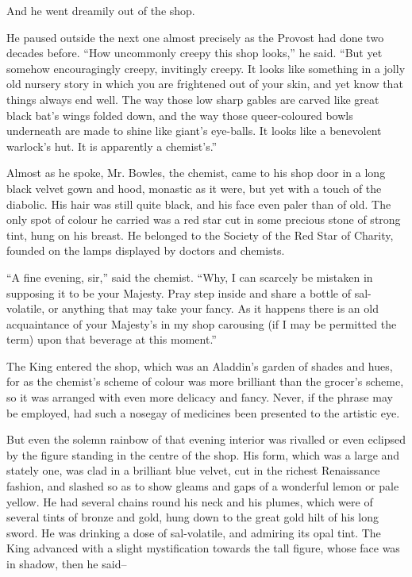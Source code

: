 \documentclass{book}
\begin{document}
And he went dreamily out of the shop.

He paused outside the next one almost precisely as the Provost had done two decades before. “How uncommonly creepy this shop looks,” he said. “But yet somehow encouragingly creepy, invitingly creepy. It looks like something in a jolly old nursery story in which you are frightened out of your skin, and yet know that things always end well. The way those low sharp gables are carved like great black bat’s wings folded down, and the way those queer-coloured bowls underneath are made to shine like giant’s eye-balls. It looks like a benevolent warlock’s hut. It is apparently a chemist’s.”

Almost as he spoke, Mr. Bowles, the chemist, came to his shop door in a long black velvet gown and hood, monastic as it were, but yet with a touch of the diabolic. His hair was still quite black, and his face even paler than of old. The only spot of colour he carried was a red star cut in some precious stone of strong tint, hung on his breast. He belonged to the Society of the Red Star of Charity, founded on the lamps displayed by doctors and chemists.

“A fine evening, sir,” said the chemist. “Why, I can scarcely be mistaken in supposing it to be your Majesty. Pray step inside and share a bottle of sal-volatile, or anything that may take your fancy. As it happens there is an old acquaintance of your Majesty’s in my shop carousing (if I may be permitted the term) upon that beverage at this moment.”

The King entered the shop, which was an Aladdin’s garden of shades and hues, for as the chemist’s scheme of colour was more brilliant than the grocer’s scheme, so it was arranged with even more delicacy and fancy. Never, if the phrase may be employed, had such a nosegay of medicines been presented to the artistic eye.

But even the solemn rainbow of that evening interior was rivalled or even eclipsed by the figure standing in the centre of the shop. His form, which was a large and stately one, was clad in a brilliant blue velvet, cut in the richest Renaissance fashion, and slashed so as to show gleams and gaps of a wonderful lemon or pale yellow. He had several chains round his neck and his plumes, which were of several tints of bronze and gold, hung down to the great gold hilt of his long sword. He was drinking a dose of sal-volatile, and admiring its opal tint. The King advanced with a slight mystification towards the tall figure, whose face was in shadow, then he said–
\end{document}
